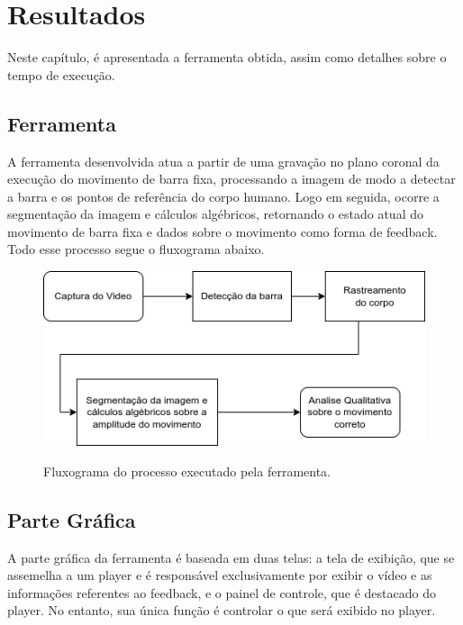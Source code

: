 \chapter{Resultados}

Neste capítulo, é apresentada a ferramenta obtida, assim como detalhes sobre o tempo de execução.

\section[Ferramenta]{Ferramenta}

A ferramenta desenvolvida atua a partir de uma gravação no plano coronal da execução do movimento de barra fixa, processando a imagem de modo a detectar a barra e os pontos de referência do corpo humano. Logo em seguida, ocorre a segmentação da imagem e cálculos algébricos, retornando o estado atual do movimento de barra fixa e dados sobre o movimento como forma de feedback. Todo esse processo segue o fluxograma abaixo.

\begin{figure}[H]
	\centering
  \caption{Fluxograma do processo executado pela ferramenta.}
	\includegraphics[scale=0.7]{figuras/diagrama/processo.png}
	\label{fig:fluxo}
\end{figure}


\section[Parte Gráfica]{Parte Gráfica}

A parte gráfica da ferramenta é baseada em duas telas: a tela de exibição, que se assemelha a um player e é responsável exclusivamente por exibir o vídeo e as informações referentes ao feedback, e o painel de controle, que é destacado do player. No entanto, sua única função é controlar o que será exibido no player.

